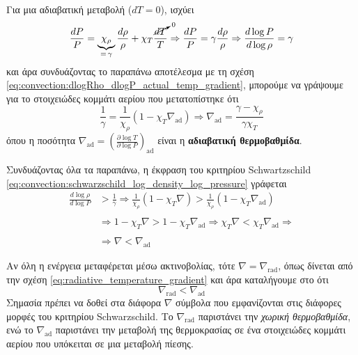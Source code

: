 Για μια αδιαβατική μεταβολή ($dT = 0$), ισχύει 
\begin{equation}
    \frac{dP}{P} = \underbrace{\chi_\rho}_{= \,\gamma} \frac{d\rho}{\rho} + \chi_T \frac{\cancelto{0}{dT}}{T} \Rightarrow \frac{dP}{P} = \gamma \frac{d\rho}{\rho} \Rightarrow \frac{d\log P}{d\log \rho} = \gamma 
\end{equation}
και άρα συνδυάζοντας το παραπάνω αποτέλεσμα με τη σχέση \eqref{eq:convection:dlogRho_dlogP_actual_temp_gradient}, μπορούμε να γράψουμε για το στοιχειώδες κομμάτι αερίου που μετατοπίστηκε ότι
\begin{equation}
    \label{eq:convection:nabla_ad}
    \frac{1}{\gamma} = \frac{1}{\chi_\rho} \left(1 - \chi_T \nabla_{\text{ad}} \right) \Rightarrow \nabla_{\text{ad}} = \frac{\gamma - \chi_\rho}{\gamma \chi_T}
\end{equation}
όπου η ποσότητα $\displaystyle \nabla_{\text{ad}} = \left(\frac{\partial \log T}{\partial \log P} \right)_{\text{ad}}$ είναι η \textbf{αδιαβατική θερμοβαθμίδα}.

Συνδυάζοντας όλα τα παραπάνω, η έκφραση του κριτηρίου Schwartzschild \eqref{eq:convection:schwarzschild_log_density_log_pressure} γράφεται
\begin{align}
    \label{eq:convection:schwartzscild_criterion_actual_temp_gradient}
    \nonumber \frac{d\log \rho}{d\log P} &> \frac{1}{\gamma} \Rightarrow \frac{1}{\chi_\rho} \left( 1 - \chi_T \nabla \right) > \frac{1}{\chi_\rho} \left(1 - \chi_T \nabla_{\text{ad}} \right) \\\nonumber\\
    &\Rightarrow 1 - \chi_T \nabla > 1 - \chi_T \nabla_{\text{ad}} \Rightarrow \chi_T \nabla < \chi_T \nabla_{\text{ad}} \Rightarrow \\\nonumber\\
    &\Rightarrow \boxed{\nabla < \nabla_{\text{ad}}}
\end{align}

Αν όλη η ενέργεια μεταφέρεται μέσω ακτινοβολίας, τότε $\nabla = \nabla_{\text{rad}}$, όπως δίνεται από την σχέση \eqref{eq:radiative_temperature_gradient} και άρα καταλήγουμε στο ότι
\begin{equation}
    \label{eq:convection:schwarzschild_criterion_nabla_rad_nabla_ad}
    \boxed{\nabla_{\text{rad}} < \nabla_{\text{ad}}}
\end{equation}
Σημασία πρέπει να δοθεί στα διάφορα $\nabla$ σύμβολα που εμφανίζονται στις διάφορες μορφές του κριτηρίου Schwarzschild. Το $\nabla_{\text{rad}}$ παριστάνει την \textit{χωρική θερμοβαθμίδα}, ενώ το $\nabla_{\text{ad}}$ παριστάνει την μεταβολή της θερμοκρασίας σε ένα στοιχειώδες κομμάτι αερίου που υπόκειται σε μια μεταβολή πίεσης.

